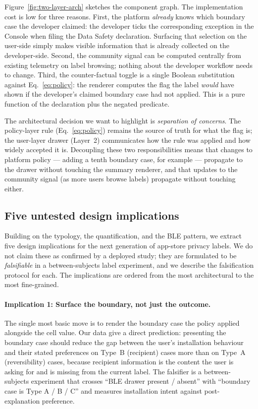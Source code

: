 \documentclass[11pt,a4paper]{article}
\begin{document}


Figure~\ref{fig:two-layer-arch} sketches the component graph. The
implementation cost is low for three reasons. First, the platform
\emph{already} knows which boundary case the developer claimed: the
developer ticks the corresponding exception in the Console when
filing the Data Safety declaration. Surfacing that selection on the
user-side simply makes visible information that is already collected
on the developer-side. Second, the community signal can be computed
centrally from existing telemetry on label browsing; nothing about
the developer workflow needs to change. Third, the counter-factual
toggle is a single Boolean substitution against
Eq.~\ref{eq:policy}: the renderer computes the flag the label
\emph{would} have shown if the developer's claimed boundary case
had not applied. This is a pure function of the declaration plus
the negated predicate.

The architectural decision we want to highlight is \emph{separation
of concerns}. The policy-layer rule (Eq.~\ref{eq:policy}) remains
the source of truth for what the flag is; the user-layer drawer
(Layer~2) communicates how the rule was applied and how widely
accepted it is. Decoupling these two responsibilities means that
changes to platform policy --- adding a tenth boundary case, for
example --- propagate to the drawer without touching the summary
renderer, and that updates to the community signal (as more users
browse labels) propagate without touching either.

\subsection{Five untested design implications}\label{sec:implications}

Building on the typology, the quantification, and the BLE pattern,
we extract five design implications for the next generation of
app-store privacy labels. We do not claim these as confirmed by a
deployed study; they are formulated to be \emph{falsifiable} in a
between-subjects label experiment, and we describe the falsification
protocol for each. The implications are ordered from
the most architectural to the most fine-grained.

\paragraph{Implication 1: Surface the boundary, not just the
outcome.} The single most basic move is to render the boundary
case the policy applied alongside the cell value. Our data give a
direct prediction: presenting the boundary case should reduce the
gap between the user's installation behaviour and their stated
preferences on Type~B (recipient) cases more than on Type~A
(reversibility) cases, because recipient information is the
content the user is asking for and is missing from the current
label. The falsifier is a between-subjects experiment that crosses
``BLE drawer present / absent'' with ``boundary case is Type A /
B / C'' and measures installation intent against post-explanation
preference.
\end{document}
